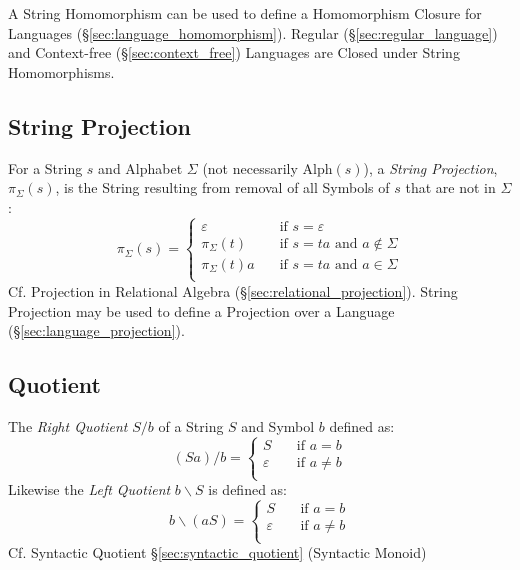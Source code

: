 A String Homomorphism can be used to define a Homomorphism Closure for Languages
(\S\ref{sec:language_homomorphism}). Regular (\S\ref{sec:regular_language}) and
Context-free (\S\ref{sec:context_free}) Languages are Closed under String
Homomorphisms.



\subsection{String Projection}\label{sec:string_projection}

For a String $s$ and Alphabet $\Sigma$ (not necessarily $\text{Alph}(s)$), a
\emph{String Projection}, $\pi_{\Sigma}(s)$, is the String resulting from
removal of all Symbols of $s$ that are not in $\Sigma$:
\[
  \pi_{\Sigma}(s) =
  \begin{cases}
    \varepsilon       & \quad \text{if $s = \varepsilon$}\\
    \pi_{\Sigma}(t)   & \quad \text{if $s = ta$ and $a \notin \Sigma$}\\
    \pi_{\Sigma}(t)a  & \quad \text{if $s = ta$ and $a \in \Sigma$}\\
  \end{cases}
\]
\fist Cf. Projection in Relational Algebra (\S\ref{sec:relational_projection}).
String Projection may be used to define a Projection over a Language
(\S\ref{sec:language_projection}).



\subsection{Quotient}\label{sec:string_quotient}

The \emph{Right Quotient} $S / b$ of a String $S$ and Symbol $b$
defined as:
\[
  (Sa)/b =
  \begin{cases}
    S           & \quad \text{if $a = b$}\\
    \varepsilon & \quad \text{if $a \neq b$}\\
  \end{cases}
\]
Likewise the \emph{Left Quotient} $b \backslash S$ is defined as:
\[
  b\backslash(aS) =
  \begin{cases}
    S           & \quad \text{if $a = b$}\\
    \varepsilon & \quad \text{if $a \neq b$}\\
  \end{cases}
\]
\fist Cf. Syntactic Quotient \S\ref{sec:syntactic_quotient} (Syntactic Monoid)



